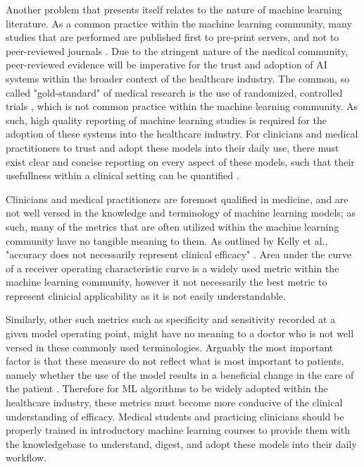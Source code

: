 \documentclass[12pt]{article}
\begin{document}
Another problem that presents itself relates to the nature of machine learning literature. As a common practice within the machine learning community, many studies that are performed are published first to pre-print servers, and not 
to peer-reviewed journals \cite{Kelly_2019}. Due to the stringent nature of the medical community, peer-reviewed evidence will be imperative for the trust and adoption of AI systems within the broader context of the healthcare industry.
The common, so called "gold-standard" of medical research is the use of randomized, controlled trials \cite{Kelly_2019,Khan_2023}, which is not common practice within the machine learning community. As such, high quality reporting of machine learning studies is required for the adoption of these systems into the healthcare industry. For clinicians and medical practitioners to trust and adopt these models into their daily use, there must exist clear and concise reporting on every aspect of these models, such that their usefullness within a clinical setting can be quantified \cite{Kelly_2019}. \

Clinicians and medical practitioners are foremost qualified in medicine, and are not well versed in the knowledge and terminology of machine learning models; as such, many of the metrics that are often utilized within the machine learning community have no tangible meaning to them. As outlined by Kelly et al., "accuracy does not necessarily represent clinical efficacy" \cite{Kelly_2019}. Area under the curve of a receiver operating characteristic curve is a widely used metric within the machine learning community, however it not necessarily the best metric to represent clinicial applicability as it is not easily understandable. \

\newpage

Similarly, other such metrics such as specificity and sensitivity recorded at a given model operating point, might have no meaning to a doctor who is not well versed in these commonly used terminologies. Arguably the most important factor is that these measure do not reflect what is most important to patients, namely whether the use of the model results in a beneficial change in the care of the patient \cite{Kelly_2019}. Therefore for ML algorithms to be widely adopted within the healthcare industry, these metrics must become more conducive of the clinical understanding of efficacy. Medical students and practicing clinicians should be properly trained in introductory machine learning courses to provide them with the knowledgebase to understand, digest, and adopt these models into their daily workflow.\
\end{document}
